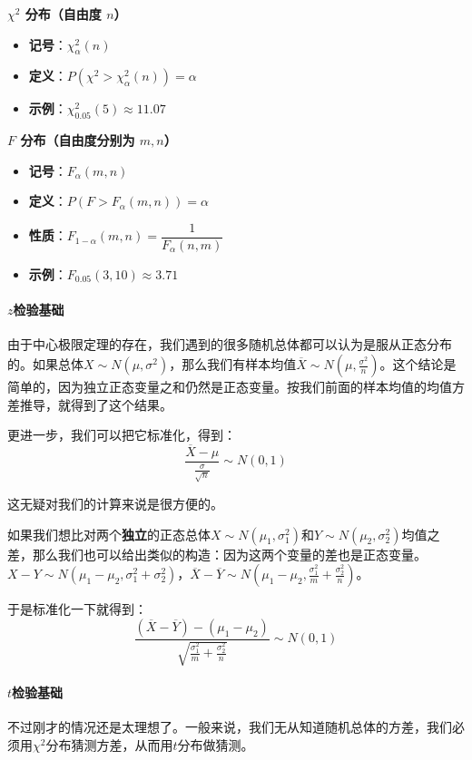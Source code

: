 \textbf{$\chi^2$ 分布（自由度 $n$）}
\begin{itemize}
    \item \textbf{记号}：$\chi^2_{\alpha}(n)$
    \item \textbf{定义}：$P(\chi^2 > \chi^2_{\alpha}(n)) = \alpha$
    \item \textbf{示例}：$\chi^2_{0.05}(5) \approx 11.07$
\end{itemize}

\textbf{$F$ 分布（自由度分别为 $m, n$）}
\begin{itemize}
    \item \textbf{记号}：$F_{\alpha}(m, n)$
    \item \textbf{定义}：$P(F > F_{\alpha}(m, n)) = \alpha$
    \item \textbf{性质}：$F_{1-\alpha}(m, n) = \dfrac{1}{F_{\alpha}(n, m)}$
    \item \textbf{示例}：$F_{0.05}(3, 10) \approx 3.71$
\end{itemize}

\paragraph{$z$检验基础}
由于中心极限定理的存在，我们遇到的很多随机总体都可以认为是服从正态分布的。如果总体$X\sim N(\mu,\sigma^2)$，那么我们有样本均值$\overline{X}\sim N(\mu, \frac{\sigma^2}{n})$。这个结论是简单的，因为独立正态变量之和仍然是正态变量。按我们前面的样本均值的均值方差推导，就得到了这个结果。

更进一步，我们可以把它标准化，得到：
\[
\frac{\overline{X}-\mu}{\frac{\sigma}{\sqrt{n}}} \sim N(0,1)
\]

这无疑对我们的计算来说是很方便的。

如果我们想比对两个\textbf{独立}的正态总体$X\sim N(\mu_1,\sigma_1^2)$和$Y\sim N(\mu_2,\sigma_2^2)$均值之差，那么我们也可以给出类似的构造：因为这两个变量的差也是正态变量。$X-Y\sim N(\mu_1-\mu_2,\sigma_1^2+\sigma_2^2)$，$\overline{X}-\overline{Y}\sim N(\mu_1-\mu_2,\frac{\sigma_1^2}{m}+\frac{\sigma_2^2}{n})$。

于是标准化一下就得到：
\[
\frac{(\overline{X}-\overline{Y})-(\mu_1-\mu_2)}{\sqrt{\frac{\sigma_1^2}{m}+\frac{\sigma_2^2}{n}}}\sim N(0,1)
\]

\paragraph{$t$检验基础}
不过刚才的情况还是太理想了。一般来说，我们无从知道随机总体的方差，我们必须用$\chi^2$分布猜测方差，从而用$t$分布做猜测。


